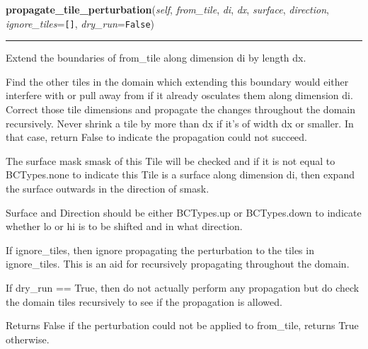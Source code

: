     \label{Tiling:Domain:propagate_tile_perturbation}

    \vspace{0.5ex}

\hspace{.8\funcindent}\begin{boxedminipage}{\funcwidth}

    \raggedright \textbf{propagate\_tile\_perturbation}(\textit{self}, \textit{from\_tile}, \textit{di}, \textit{dx}, \textit{surface}, \textit{direction}, \textit{ignore\_tiles}={\tt []}, \textit{dry\_run}={\tt False})

    \vspace{-1.5ex}

    \rule{\textwidth}{0.5\fboxrule}
\setlength{\parskip}{2ex}
    Extend the boundaries of from\_tile along dimension di by length dx.

    Find the other tiles in the domain which extending this boundary would 
    either interfere with or pull away from if it already osculates them 
    along dimension di. Correct those tile dimensions and propagate the 
    changes throughout the domain recursively. Never shrink a tile by more 
    than dx if it's of width dx or smaller. In that case, return False to 
    indicate the propagation could not succeed.

    The surface mask smask of this Tile will be checked and if it is not 
    equal to BCTypes.none to indicate this Tile is a surface along 
    dimension di, then expand the surface outwards in the direction of 
    smask.

    Surface and Direction should be either BCTypes.up or BCTypes.down to 
    indicate whether lo or hi is to be shifted and in what direction.

    If ignore\_tiles, then ignore propagating the perturbation to the tiles
    in ignore\_tiles. This is an aid for recursively propagating throughout
    the domain.

    If dry\_run == True, then do not actually perform any propagation but 
    do check the domain tiles recursively to see if the propagation is 
    allowed.

    Returns False if the perturbation could not be applied to from\_tile, 
    returns True otherwise.

\setlength{\parskip}{1ex}
    \end{boxedminipage}


